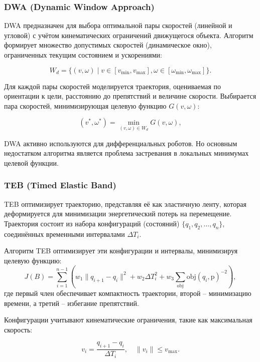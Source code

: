 \subsubsection{DWA (Dynamic Window Approach)}
DWA предназначен для выбора оптимальной пары скоростей (линейной и угловой) с
учётом кинематических ограничений движущегося объекта. Алгоритм формирует
множество допустимых скоростей (динамическое окно), ограниченных текущим
состоянием и ускорениями:

\begin{equation}
W_d = \{ (v, \omega) \mid v \in [v_{\min}, v_{\max}],	\omega \in [\omega_{\min}, \omega_{\max}] \}.
\end{equation}

Для каждой пары скоростей моделируется траектория,
оцениваемая по ориентации к цели, расстоянию до препятствий и величине скорости.
Выбирается пара скоростей, минимизирующая целевую функцию $G(v, \omega)$:

\begin{equation}
(v^*, \omega^*) = \min_{(v, \omega) \in W_d} G(v, \omega),
\end{equation}

DWA активно используются для дифференциальных роботов. Но основным недостатком алгоритма
является проблема застревания в локальных минимумах целевой функции.

\subsubsection{TEB (Timed Elastic Band)}

TEB оптимизирует траекторию, представляя её как эластичную ленту,
которая деформируется для минимизации энергетический потерь на перемещение.
Траектория состоит из набора конфигураций (состояний) $\{q_1, q_2, \dots, q_n\}$, 
соединённых временными интервалами $\Delta T_i$. 

Алгоритм TEB оптимизирует эти конфигурации и интервалы, минимизируя целевую функцию:
\begin{equation}
	J(B) = \sum_{i=1}^{n-1} \left( w_1 \| q_{i+1} - q_i \|^2 + w_2 \Delta T_i^2 + w_3 \sum_{\text{obj}} \text{obj}(q_i, \text{p})^{-2} \right),
\end{equation}
где первый член обеспечивает компактность траектории, 
второй -- минимизацию времени, 
а третий -- избегание препятствий.

Конфигурации учитывают кинематические ограничения, такие как максимальная скорость:

\begin{equation}
v_i = \frac{q_{i+1} - q_i}{\Delta T_i}, \quad \| v_i \| \leq v_{\max}.
\end{equation}
\vspace{10pt}

